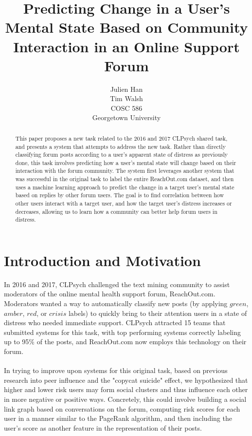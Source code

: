\documentclass{article}
\begin{document}
\title{Predicting Change in a User's Mental State Based on Community Interaction in an Online Support Forum}
\author{
Julien Han\\
Tim Walsh\\
COSC 586\\
Georgetown University\\
}
\maketitle

\begin{abstract}
This paper proposes a new task related to the 2016 and 2017 CLPsych shared task, and presents a system that attempts to address the new task. Rather than directly classifying forum posts according to a user's apparent state of distress as previously done, this task involves predicting how a user's mental state will change based on their interaction with the forum community. The system first leverages another system that was successful in the original task to label the entire ReachOut.com dataset, and then uses a machine learning approach to predict the change in a target user's mental state based on replies by other forum users. The goal is to find correlation between how other users interact with a target user, and how the target user's distress increases or decreases, allowing us to learn how a community can better help forum users in distress.
\end{abstract}

\section{Introduction and Motivation}

\paragraph{}In 2016 and 2017, CLPsych challenged the text mining community to assist moderators of the online mental health support forum, ReachOut.com. Moderators wanted a way to automatically classify new posts (by applying $green$, $amber$, $red$, or $crisis$ labels) to quickly bring to their attention users in a state of distress who needed immediate support. CLPsych attracted 15 teams that submitted systems for this task, with top performing systems correctly labeling up to 95\% of the posts, and ReachOut.com now employs this technology on their forum\cite{milne}\cite{cohan2}.

\paragraph{}In trying to improve upon systems for this original task, based on previous research into peer influence and the "copycat suicide" effect, we hypothesized that higher and lower risk users may form social clusters and thus influence each other in more negative or positive ways\cite{gladwell}\cite{phillips}\cite{stack}. Concretely, this could involve building a social link graph based on conversations on the forum, computing risk scores for each user in a manner similar to the PageRank algorithm, and then including the user's score as another feature in the representation of their posts.
\end{document}
